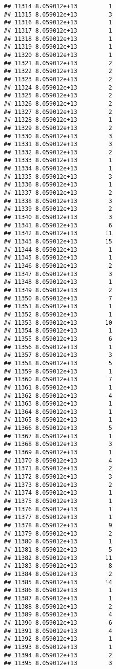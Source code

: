 \documentclass[
]{article}
\begin{document}
\begin{verbatim}
## 11314 8.059012e+13         1
## 11315 8.059012e+13         3
## 11316 8.059012e+13         1
## 11317 8.059012e+13         1
## 11318 8.059012e+13         1
## 11319 8.059012e+13         1
## 11320 8.059012e+13         1
## 11321 8.059012e+13         2
## 11322 8.059012e+13         2
## 11323 8.059012e+13         2
## 11324 8.059012e+13         2
## 11325 8.059012e+13         2
## 11326 8.059012e+13         2
## 11327 8.059012e+13         2
## 11328 8.059012e+13         1
## 11329 8.059012e+13         2
## 11330 8.059012e+13         3
## 11331 8.059012e+13         3
## 11332 8.059012e+13         2
## 11333 8.059012e+13         1
## 11334 8.059012e+13         1
## 11335 8.059012e+13         3
## 11336 8.059012e+13         1
## 11337 8.059012e+13         2
## 11338 8.059012e+13         3
## 11339 8.059012e+13         2
## 11340 8.059012e+13         3
## 11341 8.059012e+13         6
## 11342 8.059012e+13        11
## 11343 8.059012e+13        15
## 11344 8.059012e+13         1
## 11345 8.059012e+13         1
## 11346 8.059012e+13         2
## 11347 8.059012e+13         3
## 11348 8.059012e+13         1
## 11349 8.059012e+13         2
## 11350 8.059012e+13         7
## 11351 8.059012e+13         1
## 11352 8.059012e+13         1
## 11353 8.059012e+13        10
## 11354 8.059012e+13         1
## 11355 8.059012e+13         6
## 11356 8.059012e+13         1
## 11357 8.059012e+13         3
## 11358 8.059012e+13         5
## 11359 8.059012e+13         1
## 11360 8.059012e+13         7
## 11361 8.059012e+13         1
## 11362 8.059012e+13         4
## 11363 8.059012e+13         1
## 11364 8.059012e+13         1
## 11365 8.059012e+13         1
## 11366 8.059012e+13         5
## 11367 8.059012e+13         1
## 11368 8.059012e+13         3
## 11369 8.059012e+13         1
## 11370 8.059012e+13         4
## 11371 8.059012e+13         2
## 11372 8.059012e+13         3
## 11373 8.059012e+13         2
## 11374 8.059012e+13         1
## 11375 8.059012e+13         1
## 11376 8.059012e+13         1
## 11377 8.059012e+13         1
## 11378 8.059012e+13         9
## 11379 8.059012e+13         2
## 11380 8.059012e+13         1
## 11381 8.059012e+13         5
## 11382 8.059012e+13        11
## 11383 8.059012e+13         8
## 11384 8.059012e+13         2
## 11385 8.059012e+13        14
## 11386 8.059012e+13         1
## 11387 8.059012e+13         1
## 11388 8.059012e+13         2
## 11389 8.059012e+13         4
## 11390 8.059012e+13         6
## 11391 8.059012e+13         4
## 11392 8.059012e+13         1
## 11393 8.059012e+13         1
## 11394 8.059012e+13         2
## 11395 8.059012e+13         3

\end{verbatim}
\end{document}
